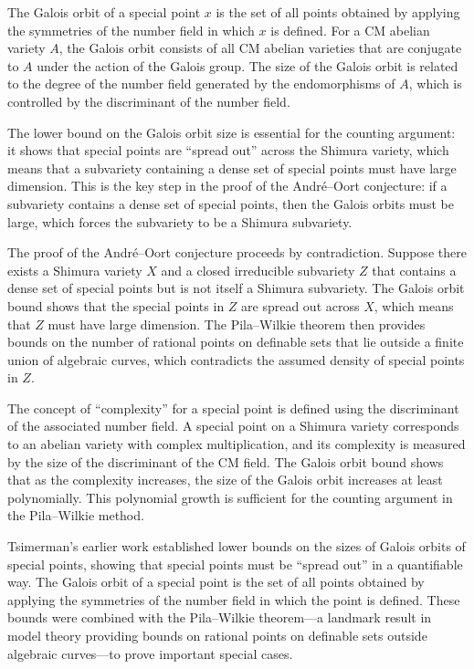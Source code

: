 The Galois orbit of a special point $x$ is the set of all points obtained by applying the symmetries of the number field in which $x$ is defined. For a CM abelian variety $A$, the Galois orbit consists of all CM abelian varieties that are conjugate to $A$ under the action of the Galois group. The size of the Galois orbit is related to the degree of the number field generated by the endomorphisms of $A$, which is controlled by the discriminant of the number field.

The lower bound on the Galois orbit size is essential for the counting argument: it shows that special points are ``spread out'' across the Shimura variety, which means that a subvariety containing a dense set of special points must have large dimension. This is the key step in the proof of the Andr\'{e}--Oort conjecture: if a subvariety contains a dense set of special points, then the Galois orbits must be large, which forces the subvariety to be a Shimura subvariety.

The proof of the Andr\'{e}--Oort conjecture proceeds by contradiction. Suppose there exists a Shimura variety $X$ and a closed irreducible subvariety $Z$ that contains a dense set of special points but is not itself a Shimura subvariety. The Galois orbit bound shows that the special points in $Z$ are spread out across $X$, which means that $Z$ must have large dimension. The Pila--Wilkie theorem then provides bounds on the number of rational points on definable sets that lie outside a finite union of algebraic curves, which contradicts the assumed density of special points in $Z$.

The concept of ``complexity'' for a special point is defined using the discriminant of the associated number field. A special point on a Shimura variety corresponds to an abelian variety with complex multiplication, and its complexity is measured by the size of the discriminant of the CM field. The Galois orbit bound shows that as the complexity increases, the size of the Galois orbit increases at least polynomially. This polynomial growth is sufficient for the counting argument in the Pila--Wilkie method.

Tsimerman's earlier work established lower bounds on the sizes of Galois orbits of special points, showing that special points must be ``spread out'' in a quantifiable way. The Galois orbit of a special point is the set of all points obtained by applying the symmetries of the number field in which the point is defined. These bounds were combined with the Pila--Wilkie theorem---a landmark result in model theory providing bounds on rational points on definable sets outside algebraic curves---to prove important special cases.

